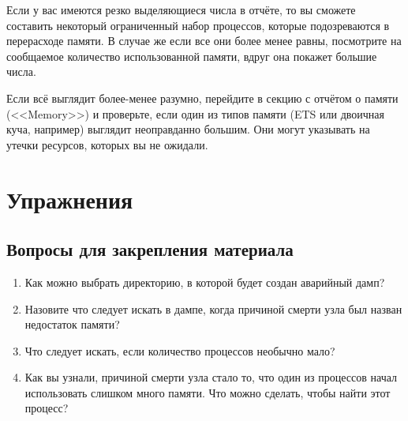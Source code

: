 \documentclass[11pt, oneside]{book}   	%
\newcommand{\ReviewTitle}{Вопросы для закрепления материала}
\begin{document}
Если у вас имеются резко выделяющиеся числа в отчёте, то вы сможете составить некоторый ограниченный набор процессов, которые подозреваются в перерасходе памяти. В случае же если все они более менее равны, посмотрите на сообщаемое количество использованной памяти, вдруг она покажет большие числа.

Если всё выглядит более-менее разумно, перейдите в секцию с отчётом о памяти (<<Memory>>) и проверьте, если один из типов памяти (ETS или двоичная куча, например) выглядит неоправданно большим. Они могут указывать на утечки ресурсов, которых вы не ожидали.


\section{Упражнения}

\subsection*{\ReviewTitle{}}

\begin{enumerate}
	\item Как можно выбрать директорию, в которой будет создан аварийный дамп?
	\item Назовите что следует искать в дампе, когда причиной смерти узла был назван недостаток памяти?
	\item Что следует искать, если количество процессов необычно мало?
	\item Как вы узнали, причиной смерти узла стало то, что один из процессов начал использовать слишком много памяти. Что можно сделать, чтобы найти этот процесс?
\end{enumerate}
\end{document}
